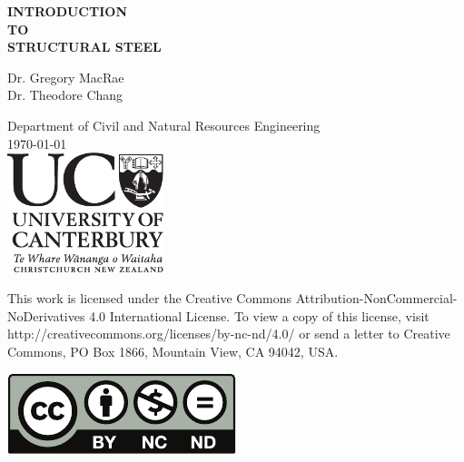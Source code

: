 \pagestyle{empty}
\begin{titlepage}
\vspace*{\fill}
\begin{flushright}\begin{spacing}{1.5}\HUGE
\textbf{INTRODUCTION\\TO\\STRUCTURAL STEEL}
\end{spacing}\end{flushright}
\vspace*{1cm}
\begin{flushright}\begin{spacing}{1.2}\LARGE
Dr. Gregory MacRae\\[.5cm]
Dr. Theodore Chang
\end{spacing}\end{flushright}
\vspace*{2cm}
\begin{center}\Large
Department of Civil and Natural Resources Engineering\\[1cm]
\today\\[1cm]
\includegraphics[height=3.5cm]{PIC/MISC/UCBLACK}
\end{center}
\vspace*{\fill}
\end{titlepage}
\clearpage
\vspace*{\fill}
This work is licensed under the Creative Commons Attribution-NonCommercial-NoDerivatives 4.0 International License. To view a copy of this license, visit http://creativecommons.org/licenses/by-nc-nd/4.0/ or send a letter to Creative Commons, PO Box 1866, Mountain View, CA 94042, USA.
\begin{center}
\includegraphics{PIC/MISC/by-nc-nd}
\end{center}
\clearpage
%
\pagestyle{fancy}
\renewcommand{\sectionmark}[1]{\markright{\thesection~#1}}
\renewcommand{\chaptermark}[1]{\markboth{#1}{}}